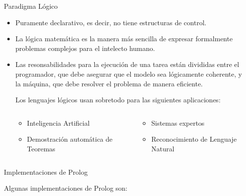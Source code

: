 \documentclass[xcolor=dvipsnames]{beamer}
\begin{document}
\begin{frame}{Paradigma Lógico}

\begin{itemize}
\item Puramente declarativo, es decir, no tiene estructuras de control.
\item La lógica matemática es la manera más sencilla de expresar formalmente problemas complejos para el intelecto humano.
\item Las resonsabilidades para la ejecución de una tarea están divididas entre el programador, que debe asegurar que el modelo sea lógicamente coherente, y la máquina, que debe resolver el problema de manera eficiente.


Los lenguajes lógicos usan sobretodo para las siguientes aplicaciones:

\begin{columns}
  \begin{column}{0.45\textwidth}
  \begin{itemize}
    \item Inteligencia Artificial
    \item Demostración automática de Teoremas
  \end{itemize}
  \end{column}

  \begin{column}{0.45\textwidth}
  \begin{itemize}
    \item Sistemas expertos
    \item Reconocimiento de Lenguaje Natural
  \end{itemize}
  \end{column}
\end{columns}

\end{itemize}

\end{frame}

\begin{frame}[containsverbatim]{Implementaciones de Prolog}

Algunas implementaciones de Prolog son:


\end{frame}
\end{document}
